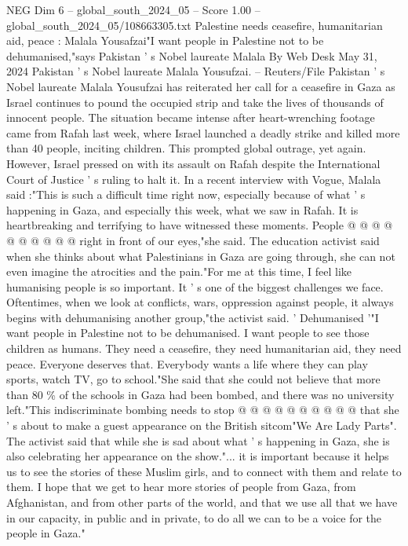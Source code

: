 \begin{textsample}{NEG Dim 6 – global\_south\_2024\_05 – Score 1.00 – global\_south\_2024\_05/108663305.txt}  \label{ex:f6_neg_286}
Palestine needs ceasefire, humanitarian aid, peace : Malala Yousafzai"I want people in Palestine not to be dehumanised,"says Pakistan ' s Nobel laureate Malala By Web Desk May 31, 2024 Pakistan ' s Nobel laureate Malala Yousufzai. -- Reuters/File Pakistan ' s Nobel laureate Malala Yousufzai has reiterated her call for a ceasefire in Gaza as Israel continues to pound the occupied strip and take the lives of thousands of innocent people.
The situation became intense after heart-wrenching footage came from Rafah last week, where Israel launched a deadly strike and killed more than 40 people, inciting children.
This prompted global outrage, yet again.
However, Israel pressed on with its assault on Rafah despite the International Court of Justice ' s ruling to halt it.
In a recent interview with Vogue, Malala said :"This is such a difficult time right now, especially because of what ' s happening in Gaza, and especially this week, what we saw in Rafah.
It is heartbreaking and terrifying to have witnessed these moments.
People @ @ @ @ @ @ @ @ @ @ right in front of our eyes,"she said.
The education activist said when she thinks about what Palestinians in Gaza are going through, she can not even imagine the atrocities and the pain."For me at this time, I feel like humanising people is so important.
It ' s one of the biggest challenges we face.
Oftentimes, when we look at conflicts, wars, oppression against people, it always begins with dehumanising another group,"the activist said. ' Dehumanised '"I want people in Palestine not to be dehumanised.
I want people to see those children as humans.
They need a ceasefire, they need humanitarian aid, they need peace.
Everyone deserves that.
Everybody wants a life where they can play sports, watch TV, go to school."She said that she could not believe that more than 80 \% of the schools in Gaza had been bombed, and there was no university left."This indiscriminate bombing needs to stop @ @ @ @ @ @ @ @ @ @ that she ' s about to make a guest appearance on the British sitcom"We Are Lady Parts".
The activist said that while she is sad about what ' s happening in Gaza, she is also celebrating her appearance on the show."... it is important because it helps us to see the stories of these Muslim girls, and to connect with them and relate to them.
I hope that we get to hear more stories of people from Gaza, from Afghanistan, and from other parts of the world, and that we use all that we have in our capacity, in public and in private, to do all we can to be a voice for the people in Gaza."

\end{textsample}
